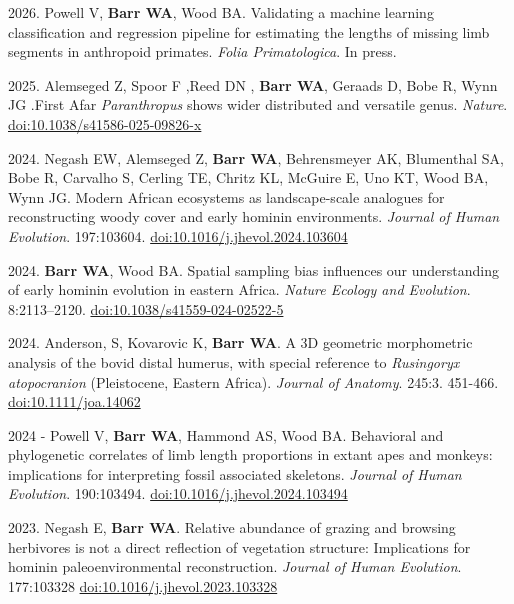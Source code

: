 \begin{etaremune} 
	
\item 2026. Powell V, {\bfseries Barr WA}, Wood BA. Validating a machine learning classification and regression pipeline for estimating the lengths of missing limb segments in anthropoid primates. \emph{Folia Primatologica}. In press. 

\item 2025. Alemseged Z, Spoor F ,Reed DN ,  {\bfseries Barr WA},  Geraads D, Bobe R, Wynn JG .First Afar \emph{Paranthropus} shows wider distributed and versatile genus. \emph{Nature}.  \href{https://doi.org/10.1038/s41586-025-09826-x}{doi:10.1038/s41586-025-09826-x}

\item 2024. Negash EW,  Alemseged Z,  {\bfseries Barr WA}, Behrensmeyer AK, Blumenthal SA, Bobe R, Carvalho S, Cerling TE, Chritz KL, McGuire E, Uno KT,  Wood BA, Wynn JG. Modern African ecosystems as landscape-scale analogues for reconstructing woody cover and early hominin environments. \emph{Journal of Human Evolution}. 197:103604. \href{https://doi.org/10.1016/j.jhevol.2024.103604}{doi:10.1016/j.jhevol.2024.103604}

\item 2024. {\bfseries Barr WA}, Wood BA. Spatial sampling bias influences our understanding of early hominin evolution in eastern Africa. \emph{Nature Ecology and Evolution}. 8:2113–2120. \href{https://www.nature.com/articles/s41559-024-02522-5}{doi:10.1038/s41559-024-02522-5}

\item 2024. Anderson, S, Kovarovic K,  {\bfseries Barr WA}. A 3D geometric morphometric analysis of the bovid distal humerus, with special reference to \emph{Rusingoryx atopocranion} (Pleistocene, Eastern Africa). \emph{Journal of Anatomy}. 245:3. 451-466. \href{https://doi.org/10.1111/joa.14062}{doi:10.1111/joa.14062}

\item 2024 - Powell V, {\bfseries Barr WA}, Hammond AS, Wood BA. Behavioral and phylogenetic correlates of limb length proportions in extant apes and monkeys: implications for interpreting fossil associated skeletons. \emph{Journal of Human Evolution}. 190:103494. \href{https://doi.org/10.1016/j.jhevol.2024.103494}{doi:10.1016/j.jhevol.2024.103494}

\item 2023. Negash E, {\bfseries Barr WA}. Relative abundance of grazing and browsing herbivores is not a direct reflection of vegetation structure: Implications for hominin paleoenvironmental reconstruction. \emph{Journal of Human Evolution}. 177:103328 \href{https://doi.org/10.1016/j.jhevol.2023.103328}{doi:10.1016/j.jhevol.2023.103328}



\end{etaremune}
